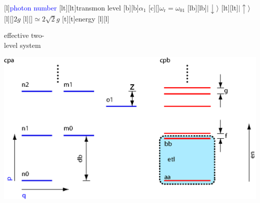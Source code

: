 

 \figstyle
 [l]{\textcolor{Blue}{photon number}}
 [lt][lt]{\textcolor{Cerulean}{transmon level}}
 [b][b]{$\alpha_1$}
 [c][]{$\omega_\text{r}=\omega_{01}$}
 [lb][lb]{$\lvert\downarrow\rangle$}
 [lt][lt]{$\lvert\uparrow\rangle$}
 [l][]{$2 g$}
 [l][]{$\simeq2\sqrt{2} g$}
 [t][t]{energy}
 [l][l]{\begin{minipage}{1 in}effective two-\\level system\end{minipage}}
 \includegraphics[height=2.5 in]{extjc.eps}

